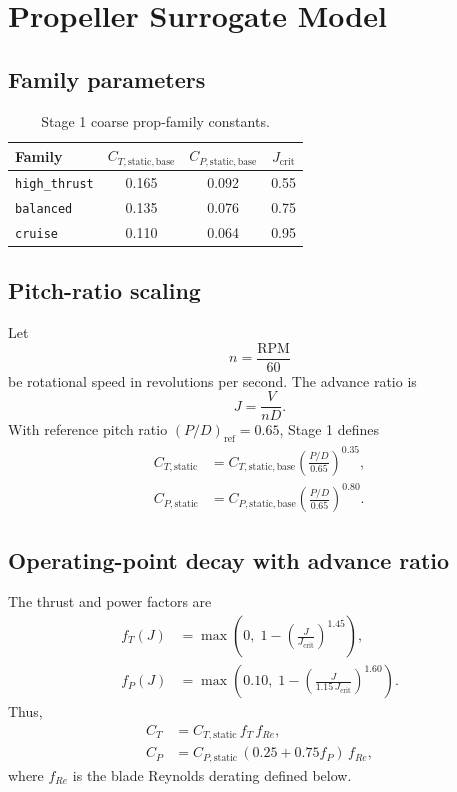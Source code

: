 \documentclass[11pt]{article}
\begin{document}
\section{Propeller Surrogate Model}

\subsection{Family parameters}

\begin{table}[h]
\centering
\begin{tabular}{lccc}
\toprule
Family & \(C_{T,\mathrm{static,base}}\) & \(C_{P,\mathrm{static,base}}\) & \(J_{\mathrm{crit}}\) \\
\midrule
\texttt{high\_thrust} & 0.165 & 0.092 & 0.55 \\
\texttt{balanced} & 0.135 & 0.076 & 0.75 \\
\texttt{cruise} & 0.110 & 0.064 & 0.95 \\
\bottomrule
\end{tabular}
\caption{Stage 1 coarse prop-family constants.}
\end{table}

\subsection{Pitch-ratio scaling}

Let
\begin{equation}
n = \frac{\mathrm{RPM}}{60}
\end{equation}
be rotational speed in revolutions per second. The advance ratio is
\begin{equation}
J = \frac{V}{nD}.
\end{equation}
With reference pitch ratio \((P/D)_{\mathrm{ref}} = 0.65\), Stage 1 defines
\begin{align}
C_{T,\mathrm{static}} &= C_{T,\mathrm{static,base}}
\left(\frac{P/D}{0.65}\right)^{0.35}, \\
C_{P,\mathrm{static}} &= C_{P,\mathrm{static,base}}
\left(\frac{P/D}{0.65}\right)^{0.80}.
\end{align}

\subsection{Operating-point decay with advance ratio}

The thrust and power factors are
\begin{align}
f_T(J) &= \max\left(0,\; 1 - \left(\frac{J}{J_{\mathrm{crit}}}\right)^{1.45}\right), \\
f_P(J) &= \max\left(0.10,\; 1 - \left(\frac{J}{1.15\,J_{\mathrm{crit}}}\right)^{1.60}\right).
\end{align}
Thus,
\begin{align}
C_T &= C_{T,\mathrm{static}}\,f_T\,f_{Re}, \\
C_P &= C_{P,\mathrm{static}}\,(0.25 + 0.75 f_P)\,f_{Re},
\end{align}
where \(f_{Re}\) is the blade Reynolds derating defined below.
\end{document}
